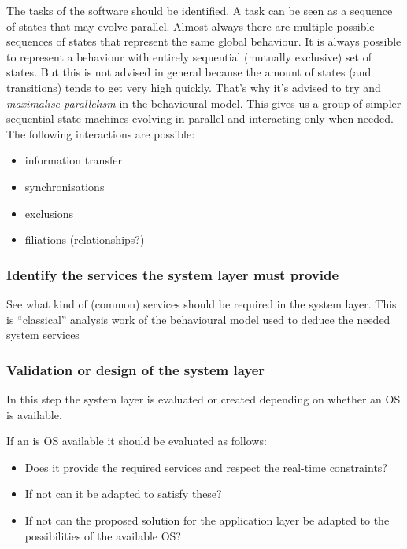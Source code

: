 \documentclass[../main.tex]{subfiles}
\begin{document}
The tasks of the software should be identified.
A task can be seen as a sequence of states that may evolve parallel.
Almost always there are multiple possible sequences of states that represent the same global behaviour.
It is always possible to represent a behaviour with entirely sequential (mutually exclusive) set of states.
But this is not advised in general because the amount of states (and transitions) tends to get very high quickly.
That's why it's advised to try and \emph{maximalise parallelism} in the behavioural model.
This gives us a group of simpler sequential state machines evolving in parallel and interacting only when needed. The following interactions are possible:
\begin{itemize}
	\item information transfer
	\item synchronisations
	\item exclusions
	\item filiations (relationships?)
\end{itemize}


\subsubsection{Identify the services the system layer must provide}
\label{sss:services}
See what kind of (common) services should be required in the system layer. 
This is ``classical'' analysis work of the behavioural model used to deduce the needed system services




\subsubsection{Validation or design of the system layer}
\label{sss:valid}
In  this step the system layer is evaluated or created depending on whether an OS is available.

If an is OS available it should be evaluated as follows:
\begin{itemize}
	\item Does it provide the required services and respect the real-time constraints? 
	\item If not can it be adapted to satisfy these?
	\item If not can the proposed solution for the application layer be adapted to the possibilities of the available OS?
\end{itemize}
\end{document}
